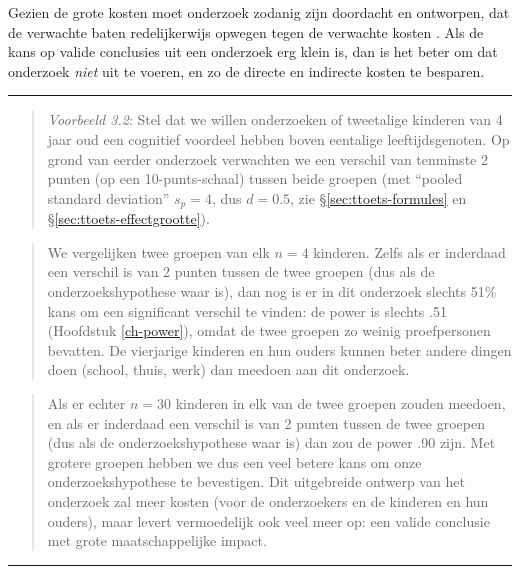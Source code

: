 \documentclass[
]{book}
\begin{document}
Gezien de grote kosten moet onderzoek zodanig zijn doordacht en
ontworpen, dat de verwachte baten redelijkerwijs opwegen tegen de
verwachte kosten \citep[Ch.3]{Rose08}. Als de kans op valide conclusies uit
een onderzoek erg klein is, dan is het beter om dat onderzoek \emph{niet} uit
te voeren, en zo de directe en indirecte kosten te besparen.

\begin{center}\rule{0.5\linewidth}{0.5pt}\end{center}

\begin{quote}
\emph{Voorbeeld 3.2}:
Stel dat we willen onderzoeken of tweetalige kinderen van 4 jaar oud een
cognitief voordeel hebben boven eentalige leeftijdsgenoten. Op grond van
eerder onderzoek verwachten we een verschil van tenminste 2 punten (op
een 10-punts-schaal) tussen beide groepen (met ``pooled standard
deviation'' \(s_p=4\), dus \(d=0.5\), zie
§\ref{sec:ttoets-formules} en §\ref{sec:ttoets-effectgrootte}).
\end{quote}

\begin{quote}
We vergelijken twee groepen van
elk \(n=4\) kinderen. Zelfs als er inderdaad een verschil is van 2 punten
tussen de twee groepen (dus als de onderzoekshypothese waar is), dan nog
is er in dit onderzoek slechts 51\% kans om een significant verschil te
vinden: de power is slechts .51
(Hoofdstuk \ref{ch-power}),
omdat de twee groepen zo weinig proefpersonen
bevatten. De vierjarige kinderen en hun ouders kunnen beter andere
dingen doen (school, thuis, werk) dan meedoen aan dit onderzoek.
\end{quote}

\begin{quote}
Als er echter \(n=30\) kinderen in elk van de twee groepen zouden meedoen,
en als er inderdaad een verschil is van 2 punten tussen de twee groepen
(dus als de onderzoekshypothese waar is) dan zou de power .90 zijn. Met
grotere groepen hebben we dus een veel betere kans om onze
onderzoekshypothese te bevestigen. Dit uitgebreide ontwerp van het
onderzoek zal meer kosten (voor de onderzoekers en de kinderen en hun
ouders), maar levert vermoedelijk ook veel meer op: een valide conclusie
met grote maatschappelijke impact.
\end{quote}

\begin{center}\rule{0.5\linewidth}{0.5pt}\end{center}
\end{document}
